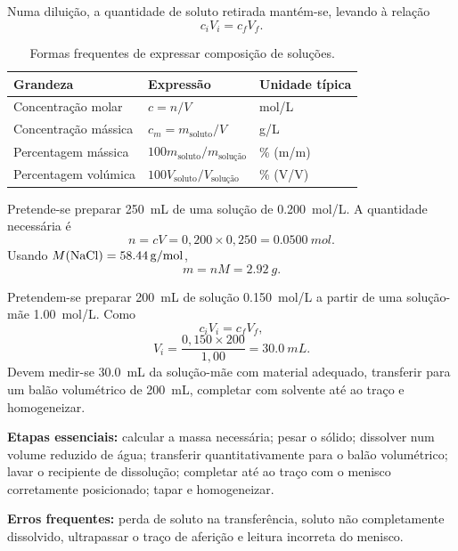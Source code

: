 \documentclass[11pt,a4paper,oneside]{book}
\begin{document}
Numa diluição, a quantidade de soluto retirada mantém-se, levando à relação
\[
c_iV_i=c_fV_f.
\]

\begin{table}[H]
\centering
\caption{Formas frequentes de expressar composição de soluções.}
\renewcommand{\arraystretch}{1.18}\begin{tabularx}{\textwidth}{lXX}
\toprule
Grandeza & Expressão & Unidade típica \\
\midrule
Concentração molar & $c=n/V$ & mol/L \\
Concentração mássica & $c_m=m_{\mathrm{soluto}}/V$ & g/L \\
Percentagem mássica & $100m_{\mathrm{soluto}}/m_{\text{solução}}$ & \% (m/m) \\
Percentagem volúmica & $100V_{\mathrm{soluto}}/V_{\text{solução}}$ & \% (V/V) \\
\bottomrule
\end{tabularx}\renewcommand{\arraystretch}{1.0}
\end{table}

\begin{exemplo}
Pretende-se preparar \SI{250}{mL} de uma solução de  \SI{0.200}{mol/L}. A quantidade necessária é
\[
n=cV=0{,}200\times0{,}250=\SI{0.0500}{mol}.
\]
Usando $M(\ce{NaCl})=\SI{58.44}{g/mol}$,
\[
m=nM=\SI{2.92}{g}.
\]
\end{exemplo}

\begin{exemplo}[title=Exemplo resolvido -- diluição]
Pretendem-se preparar \SI{200}{mL} de solução \SI{0.150}{mol/L} a partir de uma solução-mãe \SI{1.00}{mol/L}. Como
\[
c_iV_i=c_fV_f,
\]
\[
V_i=\frac{0{,}150\times200}{1{,}00}=\SI{30.0}{mL}.
\]
Devem medir-se \SI{30.0}{mL} da solução-mãe com material adequado, transferir para um balão volumétrico de \SI{200}{mL}, completar com solvente até ao traço e homogeneizar.
\end{exemplo}

\begin{atividade}[title=AL 2.2 -- Solução aquosa a partir de um soluto sólido]
\textbf{Etapas essenciais:} calcular a massa necessária; pesar o sólido; dissolver num volume reduzido de água; transferir quantitativamente para o balão volumétrico; lavar o recipiente de dissolução; completar até ao traço com o menisco corretamente posicionado; tapar e homogeneizar.

\textbf{Erros frequentes:} perda de soluto na transferência, soluto não completamente dissolvido, ultrapassar o traço de aferição e leitura incorreta do menisco.
\end{atividade}
\end{document}
